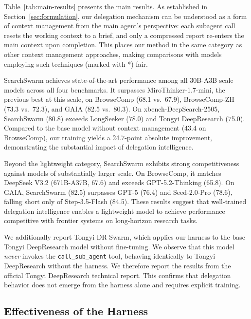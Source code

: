 \documentclass{llmxive}
\begin{document}
Table~\ref{tab:main-results} presents the main results. As established in Section~\ref{sec:formulation}, our delegation mechanism can be understood as a form of context management from the main agent's perspective: each subagent call resets the working context to a brief, and only a compressed report re-enters the main context upon completion. This places our method in the same category as other context management approaches, making comparisons with models employing such techniques (marked with *) fair.

SearchSwarm achieves state-of-the-art performance among all 30B-A3B scale models across all four benchmarks. It surpasses MiroThinker-1.7-mini, the previous best at this scale, on BrowseComp (68.1 vs.\ 67.9), BrowseComp-ZH (73.3 vs.\ 72.3), and GAIA (82.5 vs.\ 80.3). On xbench-DeepSearch-2505, SearchSwarm (80.8) exceeds LongSeeker (78.0) and Tongyi DeepResearch (75.0). Compared to the base model without context management (43.4 on BrowseComp), our training yields a 24.7-point absolute improvement, demonstrating the substantial impact of delegation intelligence.

Beyond the lightweight category, SearchSwarm exhibits strong competitiveness against models of substantially larger scale. On BrowseComp, it matches DeepSeek V3.2 (671B-A37B, 67.6) and exceeds GPT-5.2-Thinking (65.8). On GAIA, SearchSwarm (82.5) surpasses GPT-5 (76.4) and Seed-2.0-Pro (78.6), falling short only of Step-3.5-Flash (84.5). These results suggest that well-trained delegation intelligence enables a lightweight model to achieve performance competitive with frontier systems on long-horizon research tasks.

We additionally report Tongyi DR Swarm, which applies our harness to the base Tongyi DeepResearch model without fine-tuning. We observe that this model \textit{never} invokes the \texttt{call\_sub\_agent} tool, behaving identically to Tongyi DeepResearch without the harness. We therefore report the results from the official Tongyi DeepResearch technical report. This confirms that delegation behavior does not emerge from the harness alone and requires explicit training.

\subsection{Effectiveness of the Harness}
\end{document}
